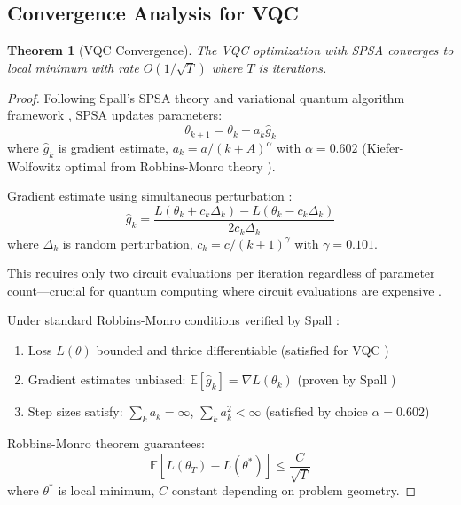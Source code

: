 \documentclass[11pt,letterpaper]{article}
\newtheorem{theorem}{Theorem}[section]
\begin{document}
\subsection{Convergence Analysis for VQC}

\begin{theorem}[VQC Convergence]
\label{thm:vqc_convergence}
The VQC optimization with SPSA \cite{spall1992multivariate} converges to local minimum with rate $O(1/\sqrt{T})$ where $T$ is iterations.
\end{theorem}

\begin{proof}
Following Spall's SPSA theory \cite{spall1992multivariate} and variational quantum algorithm framework \cite{mcclean2016theory}, SPSA updates parameters:
\begin{equation}
\theta_{k+1} = \theta_k - a_k \hat{g}_k
\end{equation}
where $\hat{g}_k$ is gradient estimate, $a_k = a/(k+A)^\alpha$ with $\alpha = 0.602$ (Kiefer-Wolfowitz optimal from Robbins-Monro theory \cite{robbins1951stochastic}).

Gradient estimate using simultaneous perturbation \cite{spall1992multivariate}:
\begin{equation}
\hat{g}_k = \frac{L(\theta_k + c_k\Delta_k) - L(\theta_k - c_k\Delta_k)}{2c_k\Delta_k}
\end{equation}
where $\Delta_k$ is random perturbation, $c_k = c/(k+1)^\gamma$ with $\gamma = 0.101$.

This requires only two circuit evaluations per iteration regardless of parameter count---crucial for quantum computing where circuit evaluations are expensive \cite{mcclean2016theory}.

Under standard Robbins-Monro conditions \cite{robbins1951stochastic} verified by Spall \cite{spall1992multivariate}:
\begin{enumerate}
\item Loss $L(\theta)$ bounded and thrice differentiable (satisfied for VQC \cite{mcclean2016theory})
\item Gradient estimates unbiased: $\mathbb{E}[\hat{g}_k] = \nabla L(\theta_k)$ (proven by Spall \cite{spall1992multivariate})
\item Step sizes satisfy: $\sum_{k} a_k = \infty$, $\sum_{k} a_k^2 < \infty$ (satisfied by choice $\alpha = 0.602$)
\end{enumerate}

Robbins-Monro theorem \cite{robbins1951stochastic} guarantees:
\begin{equation}
\mathbb{E}[L(\theta_T) - L(\theta^*)] \leq \frac{C}{\sqrt{T}}
\end{equation}
where $\theta^*$ is local minimum, $C$ constant depending on problem geometry.


\end{proof}
\end{document}
